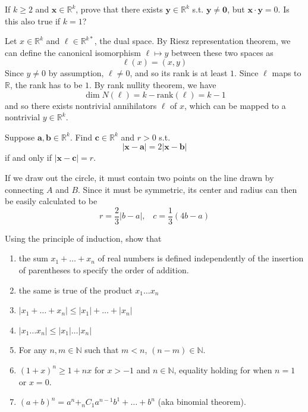 \documentclass{article}
\begin{document}
    \begin{exercise}[Rudin 1.18]
    If $k \geq 2$ and $\mathbf{x} \in \mathbb{R}^k$, prove that there exists $\mathbf{y} \in \mathbb{R}^k$ s.t. $\mathbf{y} \neq \mathbf{0}$, but $\mathbf{x} \cdot \mathbf{y} = 0$. Is this also true if $k = 1$? 
    \end{exercise}
    \begin{solution}
    Let $x \in \mathbb{R}^k$ and $\ell \in \mathbb{R}^{k \ast}$, the dual space. By Riesz representation theorem, we can define the canonical isomorphism $\ell \mapsto y$ between these two spaces as 
    \[\ell (x) = (x, y)\]
    Since $y \neq 0$ by assumption, $\ell \neq 0$, and so its rank is at least $1$. Since $\ell$ maps to $\mathbb{R}$, the rank has to be $1$. By rank nullity theorem, we have 
    \[\dim N(\ell) = k - \mathrm{rank}(\ell) = k - 1\]
    and so there exists nontrivial annihilators $\ell$ of $x$, which can be mapped to a nontrivial $y \in \mathbb{R}^k$. 
    \end{solution}

    \begin{exercise}[Rudin 1.19]
    Suppose $\mathbf{a}, \mathbf{b} \in \mathbb{R}^k$. Find $\mathbf{c} \in \mathbb{R}^k$ and $r > 0$ s.t. 
    \[|\mathbf{x} - \mathbf{a}| = 2 | \mathbf{x} - \mathbf{b}|\]
    if and only if $|\mathbf{x} - \mathbf{c}| = r$. 
    \end{exercise}
    \begin{solution}
    If we draw out the circle, it must contain two points on the line drawn by connecting $A$ and $B$. Since it must be symmetric, its center and radius can then be easily calculated to be 
    \[r = \frac{2}{3} |b - a|, \;\;\; c = \frac{1}{3} (4b - a)\]
    \end{solution}

    \begin{exercise}[Zorich 2.2.1]
    Using the principle of induction, show that 
    \begin{enumerate}
        \item the sum $x_1 + \ldots + x_n$ of real numbers is defined independently of the insertion of parentheses to specify the order of addition. 
        \item the same is true of the product $x_1 \ldots x_n$ 
        \item $|x_1 + \ldots + x_n| \leq |x_1| + \ldots + |x_n|$ 
        \item $|x_1 \ldots x_n| \leq |x_1| \ldots |x_n|$
        \item For any $n, m \in \mathbb{N}$ such that $m < n$, $(n - m) \in \mathbb{N}$. 
        \item $(1 + x)^n \geq 1 + n x$ for $x > - 1$ and $n \in \mathbb{N}$, equality holding for when $n=1$ or $x=0$. 
        \item $(a + b)^n = a^n + _n C_1 a^{n-1} b^1 + \ldots + b^n$ (aka binomial theorem). 
    \end{enumerate}
    \end{exercise}
\end{document}
